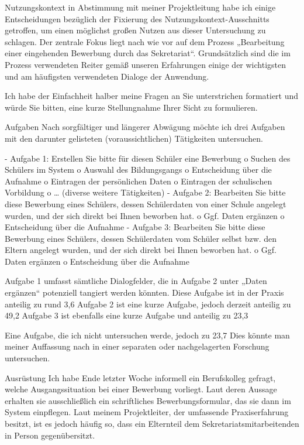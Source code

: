 Nutzungskontext
in Abstimmung mit meiner Projektleitung habe ich einige Entscheidungen bezüglich der Fixierung des Nutzungskontext-Ausschnitts getroffen, um einen möglichst großen Nutzen aus dieser Untersuchung zu schlagen.
Der zentrale Fokus liegt nach wie vor auf dem Prozess „Bearbeitung einer eingehenden Bewerbung durch das Sekretariat“. 
Grundsätzlich sind die im Prozess verwendeten Reiter gemäß unseren Erfahrungen einige der wichtigsten und am häufigsten verwendeten Dialoge der Anwendung.

Ich habe der Einfachheit halber meine Fragen an Sie unterstrichen formatiert und würde Sie bitten, eine kurze Stellungnahme Ihrer Sicht zu formulieren.

Aufgaben
Nach sorgfältiger und längerer Abwägung möchte ich drei Aufgaben mit den darunter gelisteten (voraussichtlichen) Tätigkeiten untersuchen.

-	Aufgabe 1: Erstellen Sie bitte für diesen Schüler eine Bewerbung
o	Suchen des Schülers im System
o	Auswahl des Bildungsgangs
o	Entscheidung über die Aufnahme
o	Eintragen der persönlichen Daten
o	Eintragen der schulischen Vorbildung
o	… (diverse weitere Tätigkeiten)
-	Aufgabe 2: Bearbeiten Sie bitte diese Bewerbung eines Schülers, dessen Schülerdaten von einer Schule angelegt wurden, und der sich direkt bei Ihnen beworben hat.
o	Ggf. Daten ergänzen
o	Entscheidung über die Aufnahme 
-	Aufgabe 3: Bearbeiten Sie bitte diese Bewerbung eines Schülers, dessen Schülerdaten vom Schüler selbst bzw. den Eltern angelegt wurden, und der sich direkt bei Ihnen beworben hat.
o	Ggf. Daten ergänzen
o	Entscheidung über die Aufnahme

Aufgabe 1 umfasst sämtliche Dialogfelder, die in Aufgabe 2 unter „Daten ergänzen“ potenziell tangiert werden könnten. Diese Aufgabe ist in der Praxis anteilig zu rund 3,6%
Aufgabe 2 ist eine kurze Aufgabe, jedoch derzeit anteilig zu 49,2%
Aufgabe 3 ist ebenfalls eine kurze Aufgabe und anteilig zu 23,3%

Eine Aufgabe, die ich nicht untersuchen werde, jedoch zu 23,7%
Dies könnte man meiner Auffassung nach in einer separaten oder nachgelagerten Forschung untersuchen. 

Ausrüstung
Ich habe Ende letzter Woche informell ein Berufskolleg gefragt, welche Ausgangssituation bei einer Bewerbung vorliegt. Laut deren Aussage erhalten sie ausschließlich ein schriftliches Bewerbungsformular, das sie dann im System einpflegen.
Laut meinem Projektleiter, der umfassende Praxiserfahrung besitzt, ist es jedoch häufig so, dass ein Elternteil dem Sekretariatsmitarbeitenden in Person gegenübersitzt.

